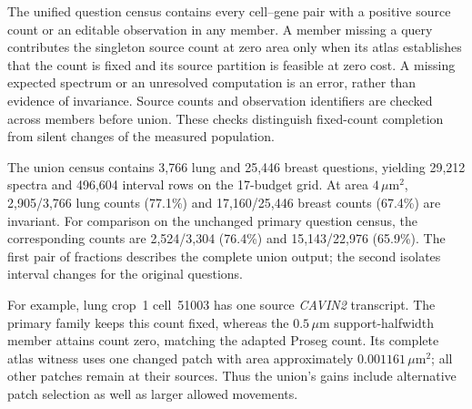 \documentclass[10pt,letterpaper]{article}
\begin{document}
The unified question census contains every cell--gene pair with a positive source count or an editable observation in any member. A member missing a query contributes the singleton source count at zero area only when its atlas establishes that the count is fixed and its source partition is feasible at zero cost. A missing expected spectrum or an unresolved computation is an error, rather than evidence of invariance. Source counts and observation identifiers are checked across members before union. These checks distinguish fixed-count completion from silent changes of the measured population.

The union census contains 3,766 lung and 25,446 breast questions, yielding 29,212 spectra and 496,604 interval rows on the 17-budget grid. At area $4\,\mu\mathrm m^2$, 2,905/3,766 lung counts (77.1\%) and 17,160/25,446 breast counts (67.4\%) are invariant. For comparison on the unchanged primary question census, the corresponding counts are 2,524/3,304 (76.4\%) and 15,143/22,976 (65.9\%). The first pair of fractions describes the complete union output; the second isolates interval changes for the original questions.

For example, lung crop~1 cell~51003 has one source \textit{CAVIN2} transcript. The primary family keeps this count fixed, whereas the $0.5\,\mu\mathrm m$ support-halfwidth member attains count zero, matching the adapted Proseg count. Its complete atlas witness uses one changed patch with area approximately $0.001161\,\mu\mathrm m^2$; all other patches remain at their sources. Thus the union's gains include alternative patch selection as well as larger allowed movements.
\end{document}
